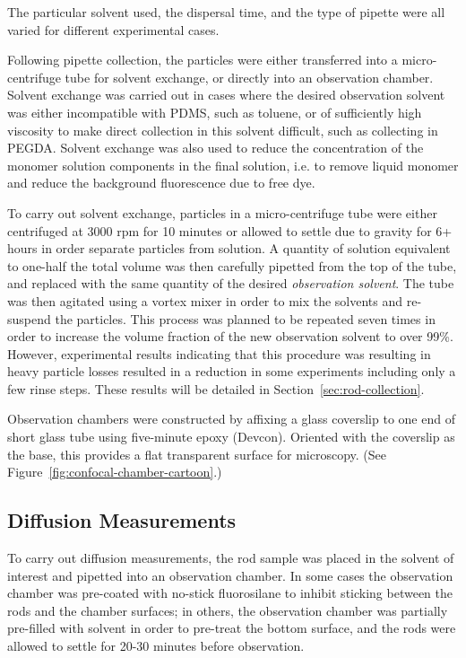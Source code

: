 The particular solvent used, the dispersal time, and the type of pipette were all varied for different experimental
cases.

Following pipette collection, the particles were either transferred into a micro-centrifuge tube for solvent 
exchange, or directly into an observation chamber.  Solvent exchange was carried out in cases where the desired
observation solvent was either incompatible with PDMS, such as toluene, or of sufficiently high viscosity to make
direct collection in this solvent difficult, such as collecting in PEGDA.  Solvent exchange was also used to reduce
the concentration of the monomer solution components in the final solution, i.e. to remove liquid monomer and 
reduce the background fluorescence due to free dye.

To carry out solvent exchange, particles in a micro-centrifuge tube were either centrifuged at 3000 rpm for 10 minutes or
allowed to settle due to gravity for 6+ hours in order separate particles from solution.  A quantity of solution equivalent
to one-half the total volume was then carefully pipetted from the top of the tube, and replaced with the same quantity of 
the desired \textit{observation solvent}.  The tube was then agitated using a vortex mixer in order to mix the solvents and
re-suspend the particles.  This process was planned to be repeated seven times in order to increase the volume fraction of
the new observation solvent to over 99\%.  However, experimental results indicating that this procedure was resulting in heavy
particle losses resulted in a reduction in some experiments including only a few rinse 
steps.  These results will be detailed in 
Section~\ref{sec:rod-collection}.



Observation chambers were constructed by affixing a glass coverslip to one end of short glass tube using 
five-minute epoxy (Devcon).  Oriented with the coverslip as the base, this provides a flat transparent surface
for microscopy. (See Figure~\ref{fig:confocal-chamber-cartoon}.)


\subsection{Diffusion Measurements}
\label{sec:exp-diffusion}

To carry out diffusion measurements, the rod sample was placed in the solvent of interest and pipetted into an observation 
chamber.  In some cases the observation chamber was pre-coated with no-stick fluorosilane 
to inhibit sticking between the rods and the chamber surfaces; in others,
the observation chamber was partially pre-filled with solvent in order to pre-treat the 
bottom surface, and the rods were allowed to settle for 20-30 minutes before observation.

